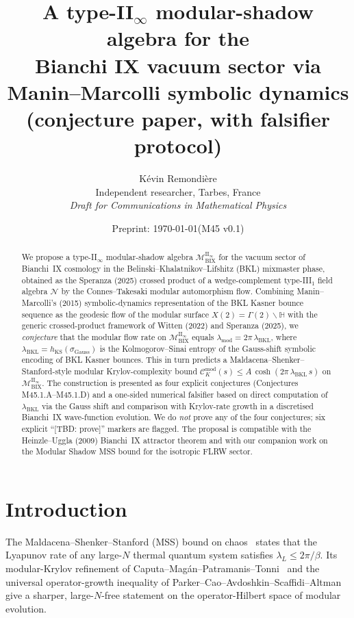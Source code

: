 \documentclass[12pt,a4paper]{article}
\title{\textbf{A type-II$_\infty$ modular-shadow algebra for the\\
       Bianchi IX vacuum sector via\\
       Manin--Marcolli symbolic dynamics}\\[6pt]
       \large (conjecture paper, with falsifier protocol)}
\author{%
  K\'evin Remondi\`ere\\[2pt]
  \small Independent researcher, Tarbes, France\\[2pt]
  \small \textit{Draft for Communications in Mathematical Physics}
}
\date{Preprint: \today\quad(M45 v0.1)}
\begin{document}
\maketitle

\begin{abstract}
We propose a type-II$_\infty$ modular-shadow algebra
$\mathcal{M}_{\mathrm{BIX}}^{\mathrm{II}_\infty}$ for the vacuum sector
of Bianchi~IX cosmology in the Belinski--Khalatnikov--Lifshitz (BKL)
mixmaster phase, obtained as the Speranza (2025)
crossed product of a wedge-complement type-III$_1$ field algebra
$\mathcal{N}$ by the Connes--Takesaki modular automorphism flow.
Combining Manin--Marcolli's (2015) symbolic-dynamics
representation of the BKL Kasner bounce sequence as the geodesic flow
of the modular surface $X(2) = \Gamma(2)\backslash\mathbb{H}$ with the
generic crossed-product framework of Witten (2022)
and Speranza (2025), we
\emph{conjecture} that the modular flow rate on
$\mathcal{M}_{\mathrm{BIX}}^{\mathrm{II}_\infty}$ equals
$\lambda_{\mathrm{mod}} = 2\pi\,\lambda_{\mathrm{BKL}}$, where
$\lambda_{\mathrm{BKL}} = h_{\mathrm{KS}}(\sigma_{\mathrm{Gauss}})$ is
the Kolmogorov--Sinai entropy of the Gauss-shift symbolic encoding of
BKL Kasner bounces.
This in turn predicts a Maldacena--Shenker--Stanford-style modular
Krylov-complexity bound
$\mathcal{C}_K^{\mathrm{mod}}(s) \le A\,\cosh(2\pi\,\lambda_{\mathrm{BKL}}\,s)$
on $\mathcal{M}_{\mathrm{BIX}}^{\mathrm{II}_\infty}$.
The construction is presented as four explicit conjectures
(Conjectures M45.1.A--M45.1.D) and a one-sided numerical falsifier
based on direct computation of $\lambda_{\mathrm{BKL}}$ via the Gauss
shift and comparison with Krylov-rate growth in a discretised
Bianchi~IX wave-function evolution.
We do \emph{not} prove any of the four conjectures; six explicit
``[TBD: prove]'' markers are flagged.
The proposal is compatible with
the Heinzle--Uggla (2009) Bianchi~IX attractor theorem
and with our companion work on the Modular Shadow MSS bound for the
isotropic FLRW sector.
\end{abstract}

\section{Introduction}\label{sec:intro}

The Maldacena--Shenker--Stanford (MSS) bound on chaos~\cite{MSS2016}
states that the Lyapunov rate of any large-$N$ thermal quantum system
satisfies $\lambda_L \le 2\pi/\beta$.
Its modular-Krylov refinement
of Caputa--Mag\'{a}n--Patramanis--Tonni~\cite{Caputa2023} and the
universal operator-growth inequality of
Parker--Cao--Avdoshkin--Scaffidi--Altman~\cite{Parker2019} give a
sharper, large-$N$-free statement on the operator-Hilbert space of
modular evolution.
\end{document}
